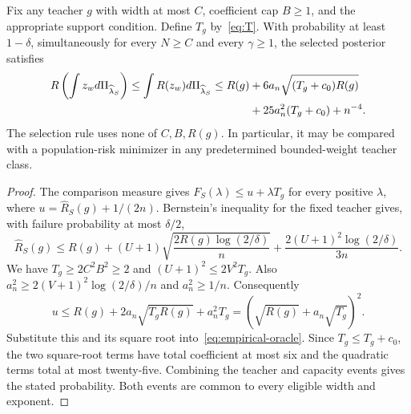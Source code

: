 \begin{theorem}
\label{thm:main}
Fix any teacher $g$ with width at most $C$, coefficient cap $B\ge1$, and the appropriate support condition. Define $T_g$ by~\eqref{eq:T}. With probability at least $1-\delta$, simultaneously for every $N\ge C$ and every $\gamma\ge1$, the selected posterior satisfies
\begin{align}
 R\left(\int z_wd\Pi_{\widehat\lambda_S}\right)
 \le\int R(z_w)d\Pi_{\widehat\lambda_S}
 \le R(g)&+6a_n\sqrt{(T_g+c_0)R(g)}\notag\\
 &+25a_n^2(T_g+c_0)+n^{-4}.
 \label{eq:main-oracle}
\end{align}
The selection rule uses none of $C,B,R(g)$. In particular, it may be compared with a population-risk minimizer in any predetermined bounded-weight teacher class.
\end{theorem}
\begin{proof}
The comparison measure gives $F_S(\lambda)\le u+\lambda T_g$ for every positive $\lambda$, where $u=\widehat R_S(g)+1/(2n)$. Bernstein's inequality for the fixed teacher gives, with failure probability at most $\delta/2$,
\[
 \widehat R_S(g)\le R(g)+(U+1)\sqrt{\frac{2R(g)\log(2/\delta)}n}
                    +\frac{2(U+1)^2\log(2/\delta)}{3n}.
\]
We have $T_g\ge2C^2B^2\ge2$ and $(U+1)^2\le2V^2T_g$. Also $a_n^2\ge2(V+1)^2\log(2/\delta)/n$ and $a_n^2\ge1/n$. Consequently
\[
 u\le R(g)+2a_n\sqrt{T_gR(g)}+a_n^2T_g
      =(\sqrt{R(g)}+a_n\sqrt{T_g})^2.
\]
Substitute this and its square root into~\eqref{eq:empirical-oracle}. Since $T_g\le T_g+c_0$, the two square-root terms have total coefficient at most six and the quadratic terms total at most twenty-five. Combining the teacher and capacity events gives the stated probability. Both events are common to every eligible width and exponent.
\end{proof}

